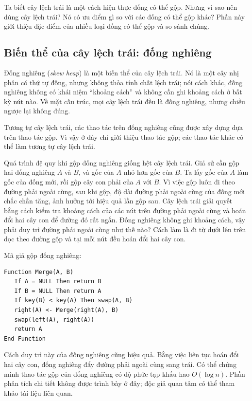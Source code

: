 \documentclass[11pt]{article}
\begin{document}
Ta biết cây lệch trái là một cách hiện thực đống có thể gộp. Nhưng vì sao nên
dùng cây lệch trái? Nó có ưu điểm gì so với các đống có thể gộp khác? Phần này
giới thiệu đặc điểm của nhiều loại đống có thể gộp và so sánh chúng.

\subsection{Biến thể của cây lệch trái: đống nghiêng}

Đống nghiêng (\emph{skew heap}) là một biến thể của cây lệch trái. Nó là một cây
nhị phân có thứ tự đống, nhưng không thỏa tính chất lệch trái; nói cách khác,
đống nghiêng không có khái niệm ``khoảng cách'' và không cần ghi khoảng cách ở
bất kỳ nút nào. Về mặt cấu trúc, mọi cây lệch trái đều là đống nghiêng, nhưng
chiều ngược lại không đúng.

Tương tự cây lệch trái, các thao tác trên đống nghiêng cũng được xây dựng dựa
trên thao tác gộp. Vì vậy ở đây chỉ giới thiệu thao tác gộp; các thao tác khác
có thể làm tương tự cây lệch trái.

Quá trình đệ quy khi gộp đống nghiêng giống hệt cây lệch trái. Giả sử cần gộp
hai đống nghiêng \(A\) và \(B\), và gốc của \(A\) nhỏ hơn gốc của \(B\). Ta lấy
gốc của \(A\) làm gốc của đống mới, rồi gộp cây con phải của \(A\) với \(B\).
Vì việc gộp luôn đi theo đường phải ngoài cùng, sau khi gộp, độ dài đường phải
ngoài cùng của đống mới chắc chắn tăng, ảnh hưởng tới hiệu quả lần gộp sau.
Cây lệch trái giải quyết bằng cách kiểm tra khoảng cách của các nút trên đường
phải ngoài cùng và hoán đổi hai cây con để đường đó rất ngắn. Đống nghiêng không
ghi khoảng cách, vậy phải duy trì đường phải ngoài cùng như thế nào? Cách làm
là đi từ dưới lên trên dọc theo đường gộp và tại mỗi nút đều hoán đổi hai cây
con.

Mã giả gộp đống nghiêng:

\begin{verbatim}
Function Merge(A, B)
   If A = NULL Then return B
   If B = NULL Then return A
   If key(B) < key(A) Then swap(A, B)
   right(A) <- Merge(right(A), B)
   swap(left(A), right(A))
   return A
End Function
\end{verbatim}

Cách duy trì này của đống nghiêng cũng hiệu quả. Bằng việc liên tục hoán đổi
hai cây con, đống nghiêng đẩy đường phải ngoài cùng sang trái. Có thể chứng
minh thao tác gộp của đống nghiêng có độ phức tạp khấu hao \(O(\log n)\). Phần
phân tích chi tiết không được trình bày ở đây; độc giả quan tâm có thể tham
khảo tài liệu liên quan.
\end{document}
